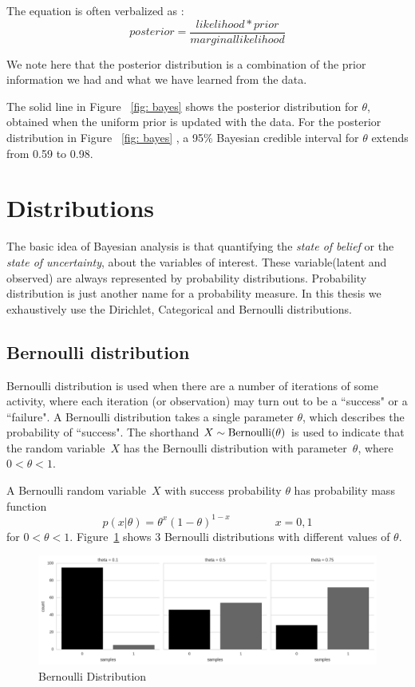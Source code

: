 The equation is often verbalized as :
\begin{equation}
	posterior = \frac{likelihood * prior}{marginal likelihood}
\end{equation}

We note here that the posterior distribution is a combination of the prior information we had and what we have learned from the data. 




The solid line in Figure ~\ref{fig: bayes} shows the posterior distribution for $\theta$, obtained when the uniform prior is updated with the data. For the posterior distribution in Figure ~\ref{fig: bayes} , a 95\% Bayesian credible interval for $\theta$ extends from 0.59 to 0.98.


\section{Distributions }

The basic idea of Bayesian analysis is that quantifying the \emph{state of belief} or the \emph{state of uncertainty}, about the variables of interest. These variable(latent and observed) are always represented by probability distributions.  Probability distribution is just another name for a probability measure.  In this thesis we exhaustively use the Dirichlet, Categorical and Bernoulli distributions. 
 

\subsection*{Bernoulli distribution}
Bernoulli distribution is used when there are a number of iterations of some activity, where each iteration (or observation) may turn out to be a ``success" or a ``failure". A Bernoulli distribution takes a single parameter $\theta$, which describes the probability of ``success".  The shorthand $X \sim {\rm Bernoulli}(\theta)$ is used to indicate that the random variable~$X$ has the Bernoulli distribution with parameter~$\theta$, where $0 < \theta < 1$.

A Bernoulli random variable~$X$ with success probability $\theta$ has
probability mass function 
$$
p(x | \theta) = \theta ^ {x} (1 - \theta) ^ {1 - x} \qquad \qquad x = 0, 1
$$
for $0 < \theta < 1$. Figure~\ref{fig:bernoulli_sample} shows 3 Bernoulli distributions with different values of $\theta$.
\begin{figure}[htp]
\centering
\includegraphics[width=\textwidth]{images/Bernoulli.png}
\caption{Bernoulli Distribution}
\label{fig:bernoulli_sample}
\end{figure}



